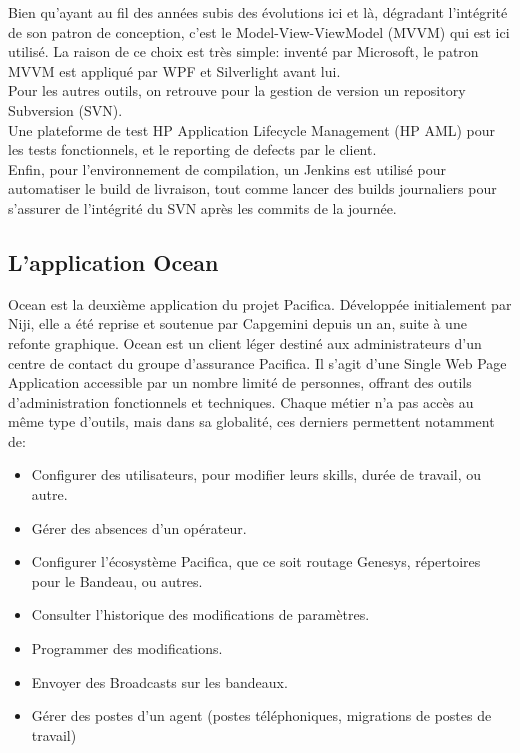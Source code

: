 \documentclass{rapport}
\begin{document}
Bien qu'ayant au fil des années subis des évolutions ici et là, dégradant l'intégrité de son patron de conception, c'est le Model-View-ViewModel (MVVM) qui est ici utilisé. La raison de ce choix est très simple: inventé par Microsoft, le patron MVVM est appliqué par WPF et Silverlight avant lui.\\

Pour les autres outils, on retrouve pour la gestion de version un repository Subversion (SVN).\\
Une plateforme de test HP Application Lifecycle Management (HP AML) pour les tests fonctionnels, et le reporting de defects par le client.\\
Enfin, pour l'environnement de compilation, un Jenkins est utilisé pour automatiser le build de livraison, tout comme lancer des builds journaliers pour s'assurer de l'intégrité du SVN après les commits de la journée.

\subsection{L'application Ocean}

Ocean est la deuxième application du projet Pacifica. Développée initialement par Niji, elle a été reprise et soutenue par Capgemini depuis un an, suite à une refonte graphique. Ocean est un client léger destiné aux administrateurs d'un centre de contact du groupe d'assurance Pacifica. Il s'agit d'une Single Web Page Application accessible par un nombre limité de personnes, offrant des outils d'administration fonctionnels et techniques. Chaque métier n'a pas accès au même type d'outils, mais dans sa globalité, ces derniers permettent notamment de:\\

\begin{itemize}
\item Configurer des utilisateurs, pour modifier leurs skills, durée de travail, ou autre.
\item Gérer des absences d'un opérateur.
\item Configurer l'écosystème Pacifica, que ce soit routage Genesys, répertoires pour le Bandeau, ou autres.
\item Consulter l'historique des modifications de paramètres.
\item Programmer des modifications.
\item Envoyer des Broadcasts sur les bandeaux.
\item Gérer des postes d'un agent (postes téléphoniques, migrations de postes de travail)
\end{itemize}
\end{document}
